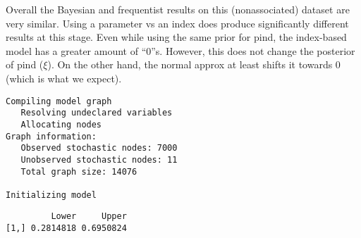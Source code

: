 \documentclass[12pt,twoside]{dukestatscithesis}
\theoremstyle{definition}
\theoremstyle{definition}
\theoremstyle{definition}
\theoremstyle{remark}
\begin{document}
Overall the Bayesian and frequentist results on this (nonassociated)
dataset are very similar. Using a parameter vs an index does produce
significantly different results at this stage. Even while using the same
prior for pind, the index-based model has a greater amount of ``0''s.
However, this does not change the posterior of pind (\(\xi\)). On the
other hand, the normal approx at least shifts it towards 0 (which is
what we expect).
\begin{Shaded}
\begin{Highlighting}[]
\StringTok{ }\NormalTok{(}
                    \NormalTok{, }\NormalTok{(}\NormalTok{, }\NormalTok{, }\NormalTok{,}\NormalTok{),}
\end{Highlighting}
\end{Shaded}
\begin{verbatim}
Compiling model graph
   Resolving undeclared variables
   Allocating nodes
Graph information:
   Observed stochastic nodes: 7000
   Unobserved stochastic nodes: 11
   Total graph size: 14076

Initializing model
\end{verbatim}
\begin{Shaded}
\begin{Highlighting}[]
\OperatorTok{$}\OperatorTok{$}\OperatorTok{$}
\end{Highlighting}
\end{Shaded}
\begin{verbatim}
         Lower     Upper
[1,] 0.2814818 0.6950824
\end{verbatim}
\begin{Shaded}
\begin{Highlighting}[]
\OperatorTok{$}\OperatorTok{$}\OperatorTok{$}
\end{Highlighting}
\end{Shaded}
\end{document}
